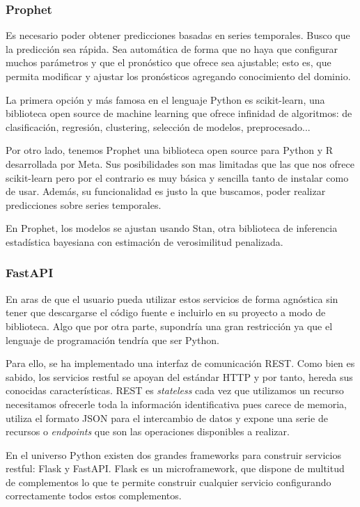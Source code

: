 \subsubsection{Prophet}
Es necesario poder obtener predicciones basadas en series temporales. Busco que la predicción sea rápida. Sea automática de forma que no haya que configurar muchos parámetros y que el pronóstico que ofrece sea ajustable; esto es, que permita modificar y ajustar los pronósticos agregando conocimiento del dominio.

La primera opción y más famosa en el lenguaje Python es scikit-learn, una biblioteca open source de machine learning que ofrece infinidad de algoritmos: de clasificación, regresión, clustering, selección de modelos, preprocesado...

Por otro lado, tenemos Prophet una biblioteca open source para Python y R desarrollada por Meta. Sus posibilidades son mas limitadas que las que nos ofrece scikit-learn pero por el contrario es muy básica y sencilla tanto de instalar como de usar. Además, su funcionalidad es justo la que buscamos, poder realizar predicciones sobre series temporales.

En Prophet, los modelos se ajustan usando Stan, otra biblioteca de inferencia estadística bayesiana con estimación de verosimilitud penalizada.

\subsubsection{FastAPI}
En aras de que el usuario pueda utilizar estos servicios de forma agnóstica sin tener que descargarse el código fuente e incluirlo en su proyecto a modo de biblioteca. Algo que por otra parte, supondría una gran restricción ya que el lenguaje de programación tendría que ser Python.

Para ello, se ha implementado una interfaz de comunicación REST. Como bien es sabido, los servicios restful se apoyan del estándar HTTP y por tanto, hereda sus conocidas características. REST es \textit{stateless} cada vez que utilizamos un recurso necesitamos ofrecerle toda la información identificativa pues carece de memoria, utiliza el formato JSON para el intercambio de datos y expone una serie de recursos o \textit{endpoints} que son las operaciones disponibles a realizar.

En el universo Python existen dos grandes frameworks para construir servicios restful: Flask y FastAPI.
Flask es un microframework, que dispone de multitud de complementos lo que te permite construir cualquier servicio configurando correctamente todos estos complementos. 


